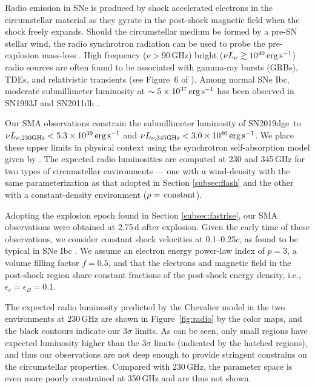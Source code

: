 \documentclass[twocolumn]{aastex63}
\newcommand{\name}{SN2019dge}
\begin{document}
Radio emission in SNe is produced by shock accelerated electrons in the circumstellar material as they 
gyrate in the post-shock magnetic field when the shock freely expands. Should the circumstellar 
medium be formed by a pre-SN stellar wind, the radio synchrotron radiation can be used to probe the 
pre-explosion mass-loss \citep{Chevalier1982}. High frequency ($\nu>90$\,GHz) bright 
($\nu L_\nu \gtrsim 10^{40} \, \rm erg\, 
s^{-1}$) radio sources are often found to be associated with gamma-ray bursts (GRBs), TDEs, and 
relativistic transients (see Figure~6 of \citealt{HoPhinney2019}). Among normal SNe Ibc, moderate 
submillimeter luminosity at $\sim 5\times 10^{37}\, \rm erg\, s^{-1}$ has been observed in SN1993J 
\citep{Weiler2007} and SN2011dh \citep{Horesh2013}.

Our SMA observations constrain the submillimeter luminosity of \name\ to $\nu L_{\nu \rm , 
	230GHz} < 5.3\times 10^{39}\, \rm erg\, s^{-1}$ and $\nu L_{\nu \rm , 345GHz} < 3.0\times 10^{40}\, 
	\rm 
erg\, s^{-1}$. We place these upper limits in physical context using the synchrotron self-absorption 
model given by \citet{Chevalier1998}. The expected radio luminosities are computed at 230 and 
345\,GHz for two types of circumstellar environments --- one with a wind-density with the same 
parameterization as that adopted in Section \ref{subsec:flash} and the other with a constant-density 
environment ($\rho = \,{\rm constant}$). 

Adopting the explosion epoch found in Section \ref{subsec:fastrise}, our SMA observations were 
obtained at 2.75\,d after explosion. Given the early time of these observations, we consider constant 
shock velocities at 0.1--0.25$c$, as found to be typical in SNe Ibc \citep{Wellons2012}. We assume an 
electron energy power-law index of $p = 3$, a volume filling factor $f=0.5$, and that the electrons 
and magnetic field in the post-shock region share constant fractions of the post-shock energy 
density, i.e., $\epsilon_e = \epsilon_B = 0.1$.

The expected radio luminosity predicted by the Chevalier model in the two environments 
at 230\,GHz are shown in Figure~\ref{fig:radio} by the color maps, and the black contours indicate our 
$3\sigma$ limits. As can be seen, only small regions have expected luminosity higher than the 
$3\sigma$ limits (indicated by the hatched regions), and thus our observations are not deep enough to 
provide stringent constrains on the circumstellar properties. Compared with 230\,GHz, the parameter 
space is even more poorly constrained at 350\,GHz and are thus not shown.
\end{document}
